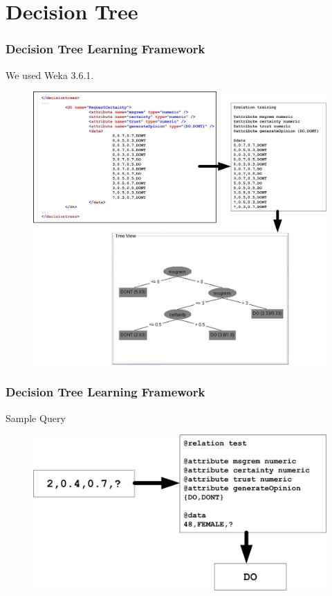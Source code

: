\section{Decision Tree}
\begin{frame}
\frametitle{Decision Tree Learning Framework}

We used Weka 3.6.1\citep*{weka}.

\begin{figure}
\centering
\includegraphics[height=0.75\textheight]{images/xml2dtxtra.jpg}
\end{figure}

\end{frame}

\begin{frame}
\frametitle{Decision Tree Learning Framework}

Sample Query

\begin{figure}
\centering
\includegraphics[width=1\textwidth]{images/xml2dttest.jpg}
\end{figure}

\end{frame}
